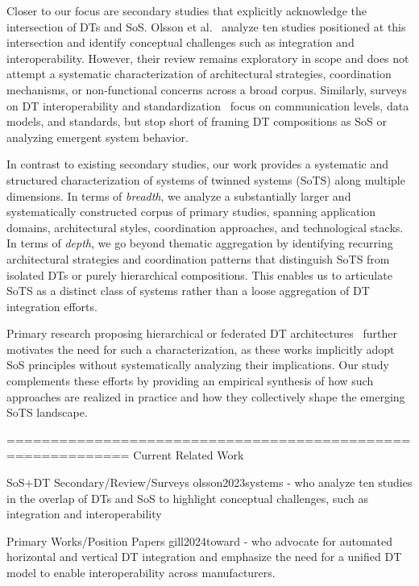Closer to our focus are secondary studies that explicitly acknowledge the intersection of DTs and SoS. Olsson et al.~\cite{olsson2023systems} analyze ten studies positioned at this intersection and identify conceptual challenges such as integration and interoperability. However, their review remains exploratory in scope and does not attempt a systematic characterization of architectural strategies, coordination mechanisms, or non-functional concerns across a broad corpus. Similarly, surveys on DT interoperability and standardization~\cite{wang2023survey, david2024interoperability} focus on communication levels, data models, and standards, but stop short of framing DT compositions as SoS or analyzing emergent system behavior.

In contrast to existing secondary studies, our work provides a systematic and structured characterization of systems of twinned systems (SoTS) along multiple dimensions. In terms of \emph{breadth}, we analyze a substantially larger and systematically constructed corpus of primary studies, spanning application domains, architectural styles, coordination approaches, and technological stacks. In terms of \emph{depth}, we go beyond thematic aggregation by identifying recurring architectural strategies and coordination patterns that distinguish SoTS from isolated DTs or purely hierarchical compositions. This enables us to articulate SoTS as a distinct class of systems rather than a loose aggregation of DT integration efforts.

Primary research proposing hierarchical or federated DT architectures~\cite{tao2019digital, schroeder2021digital, gill2024toward, ghanbarifard2023digital} further motivates the need for such a characterization, as these works implicitly adopt SoS principles without systematically analyzing their implications. Our study complements these efforts by providing an empirical synthesis of how such approaches are realized in practice and how they collectively shape the emerging SoTS landscape.

============================================================
Current Related Work

SoS+DT
Secondary/Review/Surveys
olsson2023systems - who analyze ten studies in the overlap of DTs and SoS to highlight conceptual challenges, such as integration and interoperability

Primary Works/Position Papers
gill2024toward - who advocate for automated horizontal and vertical DT integration and emphasize the need for a unified DT model to enable interoperability across manufacturers.

